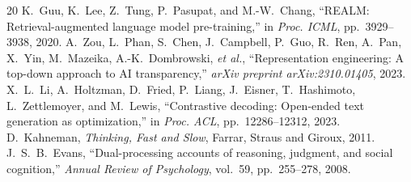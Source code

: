 \documentclass[10pt,twocolumn]{article}
\theoremstyle{definition}
\begin{document}
\begin{thebibliography}{20}
 K.~Guu, K.~Lee, Z.~Tung, P.~Pasupat, and M.-W.~Chang, ``REALM: Retrieval-augmented language model pre-training,'' in \textit{Proc. ICML}, pp.~3929--3938, 2020.
 A.~Zou, L.~Phan, S.~Chen, J.~Campbell, P.~Guo, R.~Ren, A.~Pan, X.~Yin, M.~Mazeika, A.-K.~Dombrowski, \textit{et al.}, ``Representation engineering: A top-down approach to AI transparency,'' \textit{arXiv preprint arXiv:2310.01405}, 2023.
 X.~L.~Li, A.~Holtzman, D.~Fried, P.~Liang, J.~Eisner, T.~Hashimoto, L.~Zettlemoyer, and M.~Lewis, ``Contrastive decoding: Open-ended text generation as optimization,'' in \textit{Proc. ACL}, pp.~12286--12312, 2023.
 D.~Kahneman, \textit{Thinking, Fast and Slow}, Farrar, Straus and Giroux, 2011.
 J.~S.~B.~Evans, ``Dual-processing accounts of reasoning, judgment, and social cognition,'' \textit{Annual Review of Psychology}, vol.~59, pp.~255--278, 2008.
\end{thebibliography}
\end{document}
